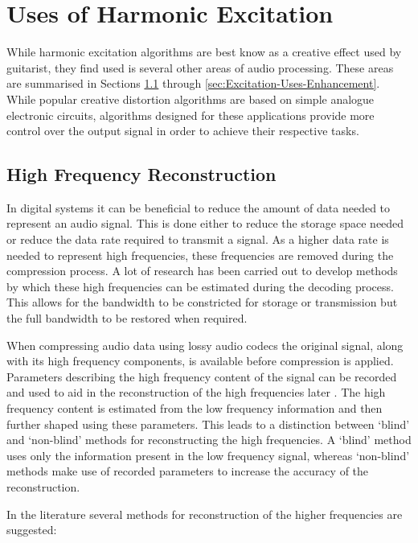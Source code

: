 \section{Uses of Harmonic Excitation}
\label{sec:Excitation-Uses}
	While harmonic excitation algorithms are best know as a creative effect used by guitarist, they find used is several
	other areas of audio processing. These areas are summarised in Sections \ref{sec:Excitation-Uses-Reconstruction}
	through \ref{sec:Excitation-Uses-Enhancement}. While popular creative distortion algorithms are based on simple
	analogue electronic circuits, algorithms designed for these applications provide more control over the output signal
	in order to achieve their respective tasks.

	\subsection{High Frequency Reconstruction}
	\label{sec:Excitation-Uses-Reconstruction}
		In digital systems it can be beneficial to reduce the amount of data needed to represent an audio signal.
		This is done either to reduce the storage space needed or reduce the data rate required to transmit a
		signal. As a higher data rate is needed to represent high frequencies, these frequencies are removed during
		the compression process. A lot of research has been carried out to develop methods by which these high
		frequencies can be estimated during the decoding process. This allows for the bandwidth to be constricted
		for storage or transmission but the full bandwidth to be restored when required.

		When compressing audio data using lossy audio codecs the original signal, along with its high frequency
		components, is available before compression is applied. Parameters describing the high frequency content
		of the signal can be recorded and used to aid in the reconstruction of the high frequencies later
		\citep{dietz2002spectral, friedrich2007spectral}. The high frequency content is estimated from the low
		frequency information and then further shaped using these parameters. This leads to a distinction between
		`blind' and `non-blind' methods for reconstructing the high frequencies. A `blind' method uses only the
		information present in the low frequency signal, whereas `non-blind' methods make use of recorded
		parameters to increase the accuracy of the reconstruction.

		In the literature several methods for reconstruction of the higher frequencies are suggested:

